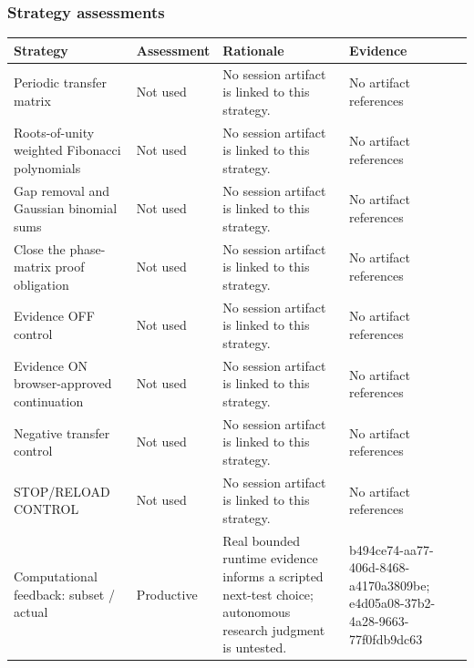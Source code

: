 \documentclass[11pt]{article}
\begin{document}
\subsubsection*{Strategy assessments}
\begin{longtable}{>{\raggedright\arraybackslash}p{.16\linewidth}>{\raggedright\arraybackslash}p{.15\linewidth}>{\raggedright\arraybackslash}p{.40\linewidth}>{\raggedright\arraybackslash}p{.17\linewidth}}
\toprule Strategy & Assessment & Rationale & Evidence \\
\midrule\endhead
Periodic transfer matrix & Not used & No session artifact is linked to this strategy. & No artifact references \\
Roots-of-unity weighted Fibonacci polynomials & Not used & No session artifact is linked to this strategy. & No artifact references \\
Gap removal and Gaussian binomial sums & Not used & No session artifact is linked to this strategy. & No artifact references \\
Close the phase-matrix proof obligation & Not used & No session artifact is linked to this strategy. & No artifact references \\
Evidence OFF control & Not used & No session artifact is linked to this strategy. & No artifact references \\
Evidence ON browser-approved continuation & Not used & No session artifact is linked to this strategy. & No artifact references \\
Negative transfer control & Not used & No session artifact is linked to this strategy. & No artifact references \\
STOP/RELOAD CONTROL & Not used & No session artifact is linked to this strategy. & No artifact references \\
Computational feedback: subset / actual & Productive & Real bounded runtime evidence informs a scripted next-test choice; autonomous research judgment is untested. & b494ce74-aa77-406d-8468-a4170a3809be; e4d05a08-37b2-4a28-9663-77f0fdb9dc63 \\
\bottomrule
\end{longtable}
\end{document}
